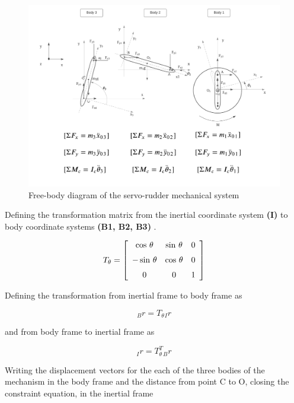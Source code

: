 \begin{figure}[h!]
  \includegraphics[scale=0.6]{graphics/Servo-Rudder2.png}
  \caption{Free-body diagram of the servo-rudder mechanical system}
  \label{fig:free-body diagram of the servo-rudder mechanical system}
\end{figure}


Defining the transformation matrix from the inertial coordinate system \textbf{(I)} to body coordinate systems \textbf{(B1, B2, B3) } \cite{santos2001dinamica}.

\begin{equation}\label{rotmat}
	T_{\theta} = \left[ \begin {array}{ccc} \cos\,\theta&\sin\,\theta&0
\\ \noalign{\medskip}-\sin\,\theta&\cos\,\theta&0
\\ \noalign{\medskip}0&0&1\end {array} \right]
\end{equation}

Defining the transformation from inertial frame to body frame as

\begin{equation}\label{i_to_B}
_{B}{r} = T_{\theta}  {_I}{r}
\end{equation}

and from body frame to inertial frame as

\begin{equation}\label{b_to_I}
_{I}{r} = T_{\theta}^T {_B }{r}
\end{equation}


Writing the displacement vectors for the each of the three bodies of the mechanism in the body frame and the distance from point C to O, closing the constraint equation, in the inertial frame



